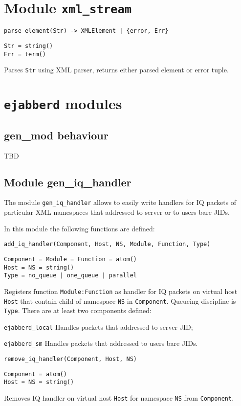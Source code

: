 \documentclass[a4paper,10pt]{article}
\newcommand{\ejabberd}{\texttt{ejabberd}}
\begin{document}
\section{Module \texttt{xml\_stream}}
\label{sec:xmlstreammod}

\begin{description}
\item{\verb!parse_element(Str) -> XMLElement | {error, Err}!}
\begin{verbatim}
Str = string()
Err = term()
\end{verbatim}
  Parses \texttt{Str} using XML parser, returns either parsed element or error
  tuple.
\end{description}


\section{\ejabberd{} modules}
\label{sec:emods}


\subsection{gen\_mod behaviour}
\label{sec:genmod}

TBD

\subsection{Module gen\_iq\_handler}
\label{sec:geniqhandl}

The module \verb|gen_iq_handler| allows to easily write handlers for IQ packets
of particular XML namespaces that addressed to server or to users bare JIDs.

In this module the following functions are defined:
\begin{description}
\item{\verb|add_iq_handler(Component, Host, NS, Module, Function, Type)|}
\begin{verbatim}
Component = Module = Function = atom()
Host = NS = string()
Type = no_queue | one_queue | parallel
\end{verbatim}
  Registers function \verb|Module:Function| as handler for IQ packets on
  virtual host \verb|Host| that contain child of namespace \verb|NS| in
  \verb|Component|.  Queueing discipline is \verb|Type|.  There are at least
  two components defined:
  \begin{description}
  \item{\verb|ejabberd_local|} Handles packets that addressed to server JID;
  \item{\verb|ejabberd_sm|} Handles packets that addressed to users bare JIDs.
  \end{description}
\item{\verb|remove_iq_handler(Component, Host, NS)|}
\begin{verbatim}
Component = atom()
Host = NS = string()
\end{verbatim}
  Removes IQ handler on virtual host \verb|Host| for namespace \verb|NS| from
  \verb|Component|.
\end{description}
\end{document}
